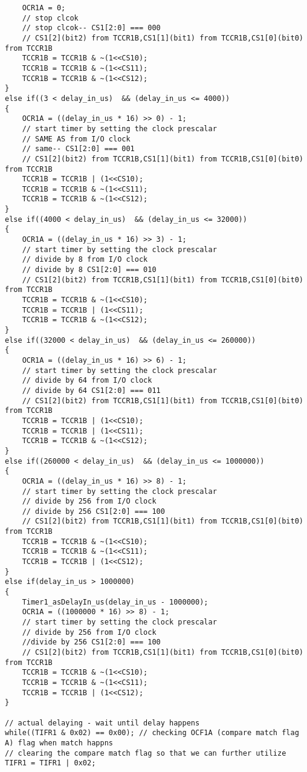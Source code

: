\begin{verbatim}
    OCR1A = 0;
    // stop clcok
    // stop clcok-- CS1[2:0] === 000
    // CS1[2](bit2) from TCCR1B,CS1[1](bit1) from TCCR1B,CS1[0](bit0) from TCCR1B
    TCCR1B = TCCR1B & ~(1<<CS10);
    TCCR1B = TCCR1B & ~(1<<CS11);
    TCCR1B = TCCR1B & ~(1<<CS12);
}
else if((3 < delay_in_us)  && (delay_in_us <= 4000))
{
    OCR1A = ((delay_in_us * 16) >> 0) - 1;
    // start timer by setting the clock prescalar
    // SAME AS from I/O clock
    // same-- CS1[2:0] === 001
    // CS1[2](bit2) from TCCR1B,CS1[1](bit1) from TCCR1B,CS1[0](bit0) from TCCR1B
    TCCR1B = TCCR1B | (1<<CS10);
    TCCR1B = TCCR1B & ~(1<<CS11);
    TCCR1B = TCCR1B & ~(1<<CS12);
}
else if((4000 < delay_in_us)  && (delay_in_us <= 32000))
{
    OCR1A = ((delay_in_us * 16) >> 3) - 1;
    // start timer by setting the clock prescalar
    // divide by 8 from I/O clock
    // divide by 8 CS1[2:0] === 010
    // CS1[2](bit2) from TCCR1B,CS1[1](bit1) from TCCR1B,CS1[0](bit0) from TCCR1B
    TCCR1B = TCCR1B & ~(1<<CS10);
    TCCR1B = TCCR1B | (1<<CS11);
    TCCR1B = TCCR1B & ~(1<<CS12);
}
else if((32000 < delay_in_us)  && (delay_in_us <= 260000))
{
    OCR1A = ((delay_in_us * 16) >> 6) - 1;
    // start timer by setting the clock prescalar
    // divide by 64 from I/O clock
    // divide by 64 CS1[2:0] === 011
    // CS1[2](bit2) from TCCR1B,CS1[1](bit1) from TCCR1B,CS1[0](bit0) from TCCR1B
    TCCR1B = TCCR1B | (1<<CS10);
    TCCR1B = TCCR1B | (1<<CS11);
    TCCR1B = TCCR1B & ~(1<<CS12);
}
else if((260000 < delay_in_us)  && (delay_in_us <= 1000000))
{
    OCR1A = ((delay_in_us * 16) >> 8) - 1;
    // start timer by setting the clock prescalar
    // divide by 256 from I/O clock
    // divide by 256 CS1[2:0] === 100
    // CS1[2](bit2) from TCCR1B,CS1[1](bit1) from TCCR1B,CS1[0](bit0) from TCCR1B
    TCCR1B = TCCR1B & ~(1<<CS10);
    TCCR1B = TCCR1B & ~(1<<CS11);
    TCCR1B = TCCR1B | (1<<CS12);
}
else if(delay_in_us > 1000000)
{
    Timer1_asDelayIn_us(delay_in_us - 1000000);
    OCR1A = ((1000000 * 16) >> 8) - 1;
    // start timer by setting the clock prescalar
    // divide by 256 from I/O clock
    //divide by 256 CS1[2:0] === 100
    // CS1[2](bit2) from TCCR1B,CS1[1](bit1) from TCCR1B,CS1[0](bit0) from TCCR1B
    TCCR1B = TCCR1B & ~(1<<CS10);
    TCCR1B = TCCR1B & ~(1<<CS11);
    TCCR1B = TCCR1B | (1<<CS12);
}

// actual delaying - wait until delay happens
while((TIFR1 & 0x02) == 0x00); // checking OCF1A (compare match flag A) flag when match happns
// clearing the compare match flag so that we can further utilize
TIFR1 = TIFR1 | 0x02;
\end{verbatim}


